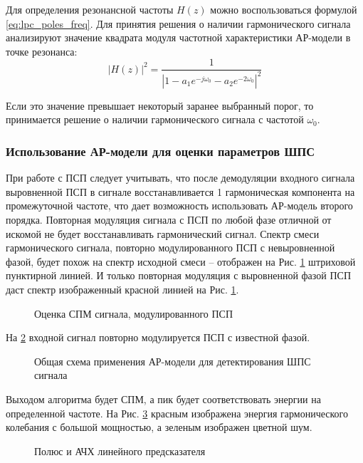 Для определения резонансной частоты ${H(z)}$ можно воспользоваться формулой \ref{eq:lpc_poles_freq}.
Для принятия решения о наличии гармонического сигнала анализируют значение квадрата модуля частотной
характеристики АР-модели в точке резонанса:
\begin{equation}
	\label{eq:lpc_power_cos}
	\left| H(z) \right|^2 = \frac{1}{\left| 1 - a_1 e^{-j \omega_0} - a_2 e^{-2 \omega_0} \right|^2}
\end{equation}

Если это значение превышает некоторый заранее выбранный порог, то принимается решение о наличии гармонического
сигнала с частотой ${\omega_0}$. 

\subsubsection{Использование АР-модели для оценки параметров ШПС}
\label{ssec2:lpc_cdma_detect}

При работе с ПСП следует учитывать, что после демодуляции входного сигнала выровненной ПСП в сигнале восстанавливается 1 гармоническая
компонента на промежуточной частоте, что дает возможность использовать АР-модель второго порядка.
Повторная модуляция сигнала с ПСП по любой фазе отличной от искомой не будет восстанавливать гармонический сигнал.
Спектр смеси гармонического сигнала, повторно модулированного ПСП с невыровненной фазой, будет похож на спектр исходной смеси – отображен
на Рис. \ref{pic:lpc_psd_1} штриховой пунктирной линией. И только повторная модуляция с выровненной фазой ПСП даст спектр
изображенный красной линией на Рис. \ref{pic:lpc_psd_1}.
\begin{figure}[h]
	\center{}
	\caption{Оценка СПМ сигнала, модулированного ПСП}
	\label{pic:lpc_psd_1}
\end{figure}

На \ref{pic:lpc_basic1} входной сигнал повторно модулируется ПСП с известной фазой.
\begin{figure}[h]
	\center{}
	\caption{Общая схема применения АР-модели для детектирования ШПС сигнала}
	\label{pic:lpc_basic1}
\end{figure}

Выходом алгоритма будет СПМ, а пик будет соответствовать энергии на определенной частоте. На Рис.
\ref{pic:lpc_poles_gps} красным изображена энергия гармонического колебания с большой мощностью, а
зеленым изображен цветной шум.
\begin{figure}[h]
	\center{}
	\caption{Полюс и АЧХ линейного предсказателя}
	\label{pic:lpc_poles_gps}
\end{figure}

